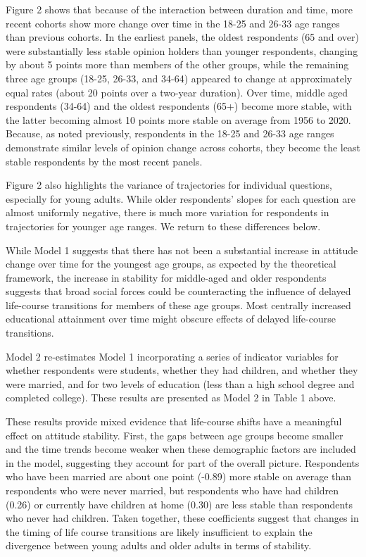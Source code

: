 \documentclass[
  12pt,
]{article}
\begin{document}
Figure 2 shows that because of the interaction between duration and time, more recent cohorts show more change over time in the 18-25 and 26-33 age ranges than previous cohorts. In the earliest panels, the oldest respondents (65 and over) were substantially less stable opinion holders than younger respondents, changing by about 5 points more than members of the other groups, while the remaining three age groups (18-25, 26-33, and 34-64) appeared to change at approximately equal rates (about 20 points over a two-year duration). Over time, middle aged respondents (34-64) and the oldest respondents (65+) become more stable, with the latter becoming almost 10 points more stable on average from 1956 to 2020. Because, as noted previously, respondents in the 18-25 and 26-33 age ranges demonstrate similar levels of opinion change across cohorts, they become the least stable respondents by the most recent panels.

Figure 2 also highlights the variance of trajectories for individual questions, especially for young adults. While older respondents' slopes for each question are almost uniformly negative, there is much more variation for respondents in trajectories for younger age ranges. We return to these differences below.

While Model 1 suggests that there has not been a substantial increase in attitude change over time for the youngest age groups, as expected by the theoretical framework, the increase in stability for middle-aged and older respondents suggests that broad social forces could be counteracting the influence of delayed life-course transitions for members of these age groups. Most centrally increased educational attainment over time might obscure effects of delayed life-course transitions.

Model 2 re-estimates Model 1 incorporating a series of indicator variables for whether respondents were students, whether they had children, and whether they were married, and for two levels of education (less than a high school degree and completed college). These results are presented as Model 2 in Table 1 above.

These results provide mixed evidence that life-course shifts have a meaningful effect on attitude stability. First, the gaps between age groups become smaller and the time trends become weaker when these demographic factors are included in the model, suggesting they account for part of the overall picture. Respondents who have been married are about one point (-0.89) more stable on average than respondents who were never married, but respondents who have had children (0.26) or currently have children at home (0.30) are less stable than respondents who never had children. Taken together, these coefficients suggest that changes in the timing of life course transitions are likely insufficient to explain the divergence between young adults and older adults in terms of stability.
\end{document}
